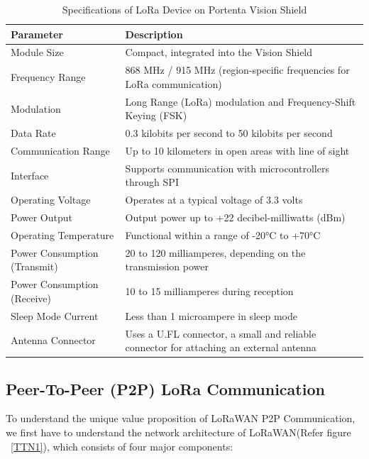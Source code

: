 \begin{table}[h!]
	\centering
	\small %
	\caption{Specifications of LoRa Device on Portenta Vision Shield} \cite{portenta_lora_specifications:2025}
	\begin{tabular}{|p{4.5cm}|p{8cm}|} %
		\hline
		\textbf{Parameter}             & \textbf{Description}                                  \\ \hline
		Module Size                    & Compact, integrated into the Vision Shield           \\ \hline
		Frequency Range                & 868 MHz / 915 MHz (region-specific frequencies for LoRa communication) \\ \hline
		Modulation                     & Long Range (LoRa) modulation and Frequency-Shift Keying (FSK) \\ \hline
		Data Rate                      & 0.3 kilobits per second to 50 kilobits per second    \\ \hline
		Communication Range            & Up to 10 kilometers in open areas with line of sight \\ \hline
		Interface                      & Supports communication with microcontrollers through SPI \\ \hline
		Operating Voltage              & Operates at a typical voltage of 3.3 volts          \\ \hline
		Power Output                   & Output power up to +22 decibel-milliwatts (dBm) \\ \hline
		Operating Temperature          & Functional within a range of -20°C to +70°C         \\ \hline
		Power Consumption (Transmit)   & 20 to 120 milliamperes, depending on the transmission power \\ \hline
		Power Consumption (Receive)    & 10 to 15 milliamperes during reception              \\ \hline
		Sleep Mode Current             & Less than 1 microampere in sleep mode               \\ \hline
		Antenna Connector              & Uses a U.FL connector, a small and reliable connector for attaching an external antenna \\ \hline
	\end{tabular}
	\label{tab:general-specifications} 
\end{table}


\subsection{Peer-To-Peer (P2P) LoRa Communication}
To understand the unique value proposition of LoRaWAN P2P Communication, we first have to understand the network architecture of LoRaWAN(Refer figure ~\ref{TTN1}), which consists of four major components: \cite{SeeedP2PLoRa2021}

